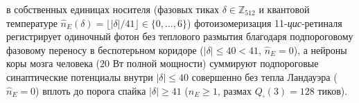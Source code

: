 \begin{itemize}[noitemsep,leftmargin=*]
\begin{itemize}[noitemsep]
    в собственных единицах носителя (фазовых тиках $\delta\in\mathbb{Z}_{512}$ и квантовой температуре $\hat{n}_E(\delta)=\lfloor|\delta|/41\rfloor\in\{0,\dots,6\}$) фотоизомеризация 11-\emph{цис}-ретиналя регистрирует одиночный фотон без теплового размытия благодаря подпороговому фазовому переносу в беспотерьном коридоре ($|\delta|\le 40 < 41$, $\hat{n}_E=0$), а нейроны коры мозга человека ($20\text{ Вт}$ полной мощности) суммируют подпороговые синаптические потенциалы внутри $|\delta|\le 40$ совершенно без тепла Ландауэра ($\hat{n}_E=0$) вплоть до порога спайка $|\delta|\ge 41$ ($\hat{n}_E\ge 1$, размах $Q_\square(3)=128$ тиков).
  \end{itemize}
\end{itemize}

